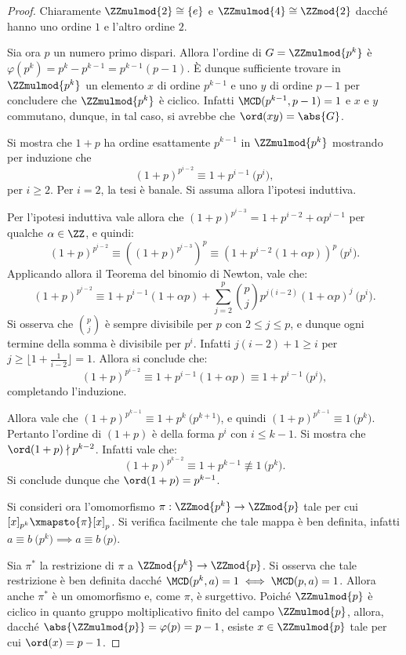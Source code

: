 \documentclass[12pt]{scrartcl}
\begin{document}
	\begin{proof}
		Chiaramente $\ZZmulmod{2} \cong \{e\}$ e
		$\ZZmulmod{4} \cong \ZZmod{2}$ dacché hanno uno
		ordine $1$ e l'altro ordine $2$. \medskip

		
		Sia ora $p$ un numero primo dispari. Allora l'ordine di
		$G = \ZZmulmod{p^k}$ è $\varphi(p^k) = p^k - p^{k-1} =
		p^{k-1}(p-1)$. È dunque sufficiente trovare in
		$\ZZmulmod{p^k}$ un elemento $x$ di ordine
		$p^{k-1}$ e uno $y$ di ordine $p-1$ per concludere
		che $\ZZmulmod{p^k}$ è ciclico. Infatti $\MCD(p^{k-1}, p-1) = 1$ e $x$ e $y$ commutano, dunque, in tal caso, si avrebbe
		che $\ord(xy) = \abs{G}$. \medskip
		
		
		Si mostra che $1+p$ ha ordine esattamente $p^{k-1}$ in
		$\ZZmulmod{p^k}$ mostrando per induzione che
		\[ (1+p)^{p^{i-2}} \equiv 1 + p^{i-1} \pod{p^i}, \]
		per $i \geq 2$. Per $i = 2$, la tesi è banale. Si
		assuma allora l'ipotesi induttiva. \medskip
		
		Per l'ipotesi induttiva vale allora che
		$(1+p)^{p^{i-3}} = 1 + p^{i-2} + \alpha p^{i-1}$ per qualche
		$\alpha \in \ZZ$, e quindi:
		\[ (1+p)^{p^{i-2}} \equiv ((1+p)^{p^{i-3}})^p \equiv
		(1 + p^{i-2}(1 + \alpha p))^p \pod{p^i}. \]
		Applicando allora il Teorema del binomio di Newton,
		vale che:
		\[ (1+p)^{p^{i-2}} \equiv 1 + p^{i-1}(1+\alpha p) + \sum_{j=2}^{p} \binom{p}{j} p^{j(i-2)}(1 + \alpha p)^j \pod{p^i}. \]
		Si osserva che $\binom{p}{j}$ è sempre divisibile per $p$
		con $2 \leq j \leq p$, e dunque ogni termine della
		somma è divisibile per $p^i$. Infatti $j(i-2)+1 \geq i$
		per $j \geq \lfloor 1 + \frac{1}{i-2} \rfloor = 1$. Allora
		si conclude che:
		\[  (1+p)^{p^{i-2}} \equiv 1 + p^{i-1}(1+\alpha p) \equiv 1  + p^{i-1} \pod{p^i}, \]
		completando l'induzione. \medskip
		
		
		Allora vale che $(1+p)^{p^{k-1}} \equiv 1 + p^k \pod{p^{k+1}}$,
		e quindi $(1+p)^{p^{k-1}} \equiv 1 \pod{p^k}$. Pertanto
		l'ordine di $(1+p)$ è della forma $p^i$ con $i \leq k-1$.
		Si mostra che $\ord(1+p) \nmid p^{k-2}$. Infatti vale
		che:
		\[ (1+p)^{p^{k-2}} \equiv 1 + p^{k-1} \not\equiv 1 \pod{p^k}. \]
		Si conclude dunque che $\ord(1+p) = p^{k-1}$. \bigskip
		
		
		Si consideri ora l'omomorfismo $\pi : \ZZmod{p^k} \to \ZZmod{p}$ tale per cui $[x]_{p^k} \xmapsto{\pi} [x]_p$.
		Si verifica facilmente che tale mappa è ben definita,
		infatti $a \equiv b \pod{p^k} \implies a \equiv b \pod{p}$. \medskip
		
		
		Sia $\pi^*$ la restrizione di $\pi$ a $\ZZmod{p^k} \to
		\ZZmod{p}$. Si osserva che tale restrizione è ben definita dacché
		$\MCD(p^k, a) = 1 \iff \MCD(p, a) = 1$. Allora anche
		$\pi^*$ è un omomorfismo e, come $\pi$, è surgettivo.
		Poiché $\ZZmulmod{p}$ è ciclico in quanto gruppo moltiplicativo finito del campo $\ZZmulmod{p}$, allora,
		dacché $\abs{\ZZmulmod{p}} = \varphi(p) = p-1$,
		esiste $x \in \ZZmulmod{p}$ tale per cui $\ord(x) = p-1$.
		\medskip
		

\end{proof}
\end{document}
